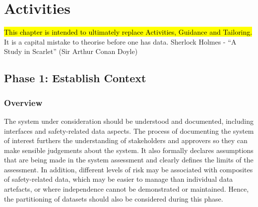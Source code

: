 %
%
\chapter{Activities}\label{bkm:activities}
\hl{This chapter is intended to ultimately replace Activities, Guidance and Tailoring. }
\dsiwgSectionQuote
  {It is a capital mistake to theorise before one has data.}
  {Sherlock Holmes - ``A Study in Scarlet'' (Sir Arthur Conan Doyle)}


\section{Phase 1: Establish Context}\label{bkm:establishcontext}
\subsection{Overview}
The system under consideration should be understood and documented, including interfaces and safety-related data aspects. The process of documenting the system of interest furthers the understanding of \glspl{stakeholder} and approvers so they can make sensible judgements about the system. It also formally declares assumptions that are being made in the system assessment and clearly defines the limits of the assessment. In addition, different levels of risk may be associated with composites of safety-related data, which may be easier to manage than individual \glspl{data artefact}, or where independence cannot be demonstrated or maintained. Hence, the partitioning of \glspl{dataset} should also be considered during this phase.

